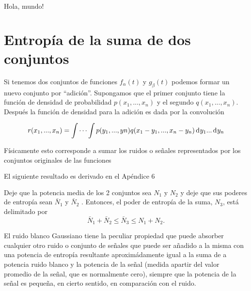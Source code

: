 {\textexclamdown}Hola, mundo!

\section{Entrop\'ia de la suma de dos conjuntos}

	Si tenemos dos conjuntos de funciones $f_{\alpha}(t)$ y
	$g_{\beta}(t)$ podemos formar un nuevo conjunto por
	``adici\'on''. Supongamos que el primer conjunto tiene la
	funci\'on de densidad de probabilidad $p(x_{1},...,x_{n})$ y
	el segundo $q(x_{1},...,x_{n})$.  Despu\'es la funci\'on de
	densidad para la adici\'on es dada por la convoluci\'on
	
	\begin{equation} r(x_{1},...,x_{n}) = \int \cdots \int
		p(y_{1},...,y{n})q(x_{1}-y_{1},...,x_{n}-y_{n}) \diff y_{1}... \diff y_{n} \end{equation}
	
	F\'isicamente esto corresponde a sumar los ruidos o se\~nales
	representados por los conjuntos originales de las funciones
	
		
	El siguiente resultado es derivado en el Ap\'endice 6
	
    \begin{theorem} Deje que la potencia media de los 2 conjuntos sea
    $N_{1}$ y $N_{2}$ y deje que sus poderes de entrop\'ia sean
    $\bar{N}_1$ y $\bar{N}_2$ . Entonces, el poder de entrop\'ia de
    la suma, $N_{3}$, est\'a delimitado
    por \begin{equation} \bar{N}_1+\bar{N}_2 \le \bar{N}_3 \le
    N_{1}+N_{2}.  \end{equation} \end{theorem}
	
	El ruido blanco Gaussiano tiene la peculiar propiedad que
	puede absorber cualquier otro ruido o conjunto de se\~nales
	que puede ser a\~nadido a la misma con una potencia de
	entrop\'ia resultante aproxim\'adamente igual a la suma de a
	potencia ruido blanco y la potencia de la se\~nal (medida
	apartir del valor promedio de la se\~nal, que es normalmente
	cero), siempre que la potencia de la se\~{n}al es peque\~na,
	en cierto sentido, en comparaci\'on con el ruido.
	
